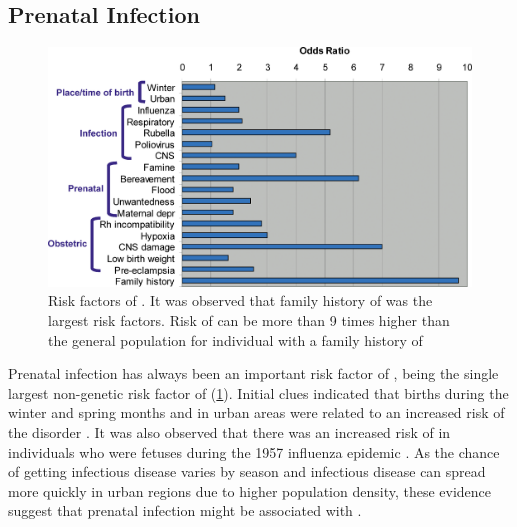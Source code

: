 	\subsection{Prenatal Infection}
	\begin{figure}
		\centering
		\includegraphics[width=\textwidth]{figure/risk_factors_of_schizophrenia.png}
		\caption[Risk factors of ]{Risk factors of .
			It was observed that family history of  was the largest risk factors.
			Risk of  can be more than 9 times higher than the general population for individual with a family history of }
		\label{fig:riskfactors}
	\end{figure}
	Prenatal infection has always been an important risk factor of , being the single largest non-genetic risk factor of  (\cref{fig:riskfactors})\citep{Sullivan2005}.
	Initial clues indicated that births during the winter and spring months and in urban areas were related to an increased risk of the disorder \citep{Brown2010}.
	It was also observed that there was an increased risk of  in individuals who were fetuses during the 1957 influenza epidemic \citep{Mednick1958}.
	As the chance of getting infectious disease varies by season and infectious disease can spread more quickly in urban regions due to higher population density, these evidence suggest that prenatal infection might be associated with .
	
